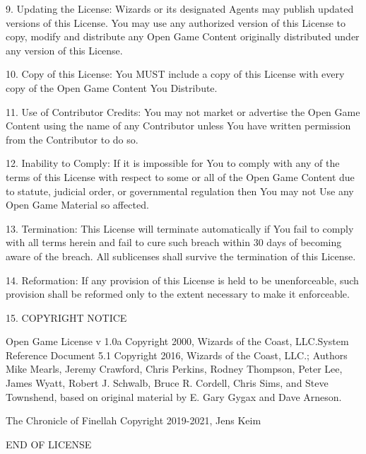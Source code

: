 \documentclass[letter,10pt,twocolumn,openany]{dndbook}
\begin{document}
9. Updating the License: Wizards or its designated Agents may publish updated versions of this License. You may use any authorized version of this License to copy, modify and distribute any Open Game Content originally distributed under any version of this License.

10. Copy of this License: You MUST include a copy of this License with every copy of the Open Game Content You Distribute.

11. Use of Contributor Credits: You may not market or advertise the Open Game Content using the name of any Contributor unless You have written permission from the Contributor to do so.

12. Inability to Comply: If it is impossible for You to comply with any of the terms of this License with respect to some or all of the Open Game Content due to statute, judicial order, or governmental regulation then You may not Use any Open Game Material so affected.

13. Termination: This License will terminate automatically if You fail to comply with all terms herein and fail to cure such breach within 30 days of becoming aware of the breach. All sublicenses shall survive the termination of this License.

14. Reformation: If any provision of this License is held to be unenforceable, such provision shall be reformed only to the extent necessary to make it enforceable.

15. COPYRIGHT NOTICE

    Open Game License v 1.0a Copyright 2000, Wizards of the Coast, LLC.System Reference Document 5.1 Copyright 2016, Wizards of the Coast, LLC.; Authors Mike Mearls, Jeremy Crawford, Chris Perkins, Rodney Thompson, Peter Lee, James Wyatt, Robert J. Schwalb, Bruce R. Cordell, Chris Sims, and Steve Townshend, based on original material by E. Gary Gygax and Dave Arneson.

    The Chronicle of Finellah Copyright 2019-2021, Jens Keim

END OF LICENSE
\end{document}
